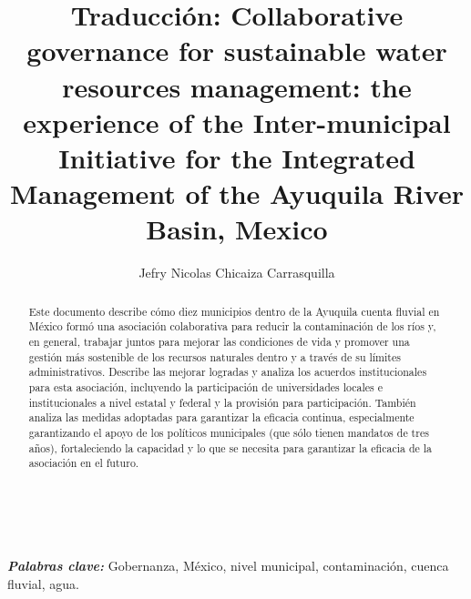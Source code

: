 \documentclass[10pt,letterpaper,onecolumn]{article}
\title{
    \fontsize{16}{16}\selectfont 
    \textbf{Traducción: Collaborative governance for sustainable water resources management: the experience of the Inter-municipal Initiative for the Integrated Management of the Ayuquila River Basin, Mexico
    \vspace{-1mm}}}
\author[1]{Jefry Nicolas Chicaiza Carrasquilla}
\affil[1]{\url{jefryn@unicauca.edu.co}
    \vspace{-2mm}}
\date{}
\providecommand{\keywords}[1]
{
  \textbf{\textit{Palabras clave: }} #1
}
\begin{document}
\maketitle
\vspace{-5mm}
\thispagestyle{fancy}
\begin{abstract}
    Este documento describe cómo diez municipios dentro de la Ayuquila cuenta fluvial en México formó una asociación colaborativa para reducir la contaminación de los ríos y, en general, trabajar juntos para mejorar las condiciones de vida y promover una gestión más sostenible de los recursos naturales dentro y a través de su límites administrativos. Describe las mejorar logradas y analiza los acuerdos institucionales para esta asociación, incluyendo la participación de universidades locales e institucionales a nivel estatal y federal y la provisión para participación. También analiza las medidas adoptadas para garantizar la eficacia continua, especialmente garantizando el apoyo de los políticos municipales (que sólo tienen mandatos de tres años), fortaleciendo la capacidad y lo que se necesita para garantizar la eficacia de la asociación en el futuro.
\end{abstract}
\\\\
\keywords{Gobernanza, México, nivel municipal, contaminación, cuenca fluvial, agua.}


\printbibliography[title={Bibliografía}]
\end{document}
